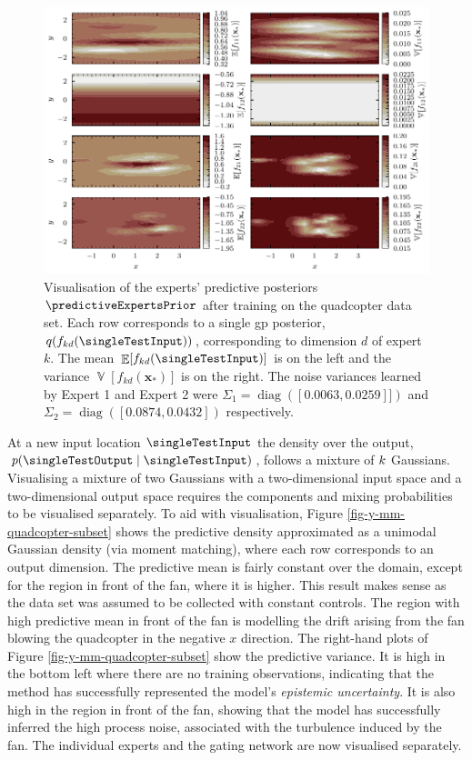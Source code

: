 \documentclass{mimosis-class/mimosis}
\numberwithin{equation}{chapter}
\newcommand{\diag}{\mathop{\mathrm{diag}}}
\DeclareMathOperator{\E}{\mathbb{E}}
\DeclareMathOperator{\V}{\mathbb{V}}
\newcommand{\modeInd}{\ensuremath{k}}
\newcommand{\ModeInd}{\ensuremath{\MakeUppercase{\modeInd}}}
\newcommand{\x}{\ensuremath{\mathbf{x}}}
\begin{document}
{\begin{figure}[t!]
\centering
\includegraphics[width=1\textwidth]{./images/model/quadcopter/subset-10/experts_f.pdf}
\caption[\acrshort{mosvgpe}'s experts' posteriors with \(\ModeInd=2\) after training on the real-world quadcopter data set with \(\furtherBound\)]{\label{fig-experts-f-quadcopter-subset}Visualisation of the experts' predictive posteriors \(\predictiveExpertsPrior\) after training on the quadcopter data set. Each row corresponds to a single \acrshort{gp} posterior, \(q(f_{kd}(\singleTestInput))\), corresponding to dimension \(d\) of expert \(\modeInd\). The mean \(\E[f_{kd}(\singleTestInput)]\) is on the left and the variance \(\V[f_{kd}(\x_*)]\) is on the right. The noise variances learned by Expert 1 and Expert 2 were \(\Sigma_1 = \diag\left([0.0063, 0.0259]]\right)\) and \(\Sigma_2 = \diag\left([0.0874, 0.0432]\right)\) respectively.}
\end{figure}


At a new input location \(\singleTestInput\) the density over the output,
\(p(\singleTestOutput \mid \singleTestInput)\),
follows a mixture of \(\ModeInd\) Gaussians.
Visualising a mixture of two Gaussians with a two-dimensional input space and a two-dimensional output space
requires the components and mixing probabilities to be visualised separately.
To aid with visualisation, Figure \ref{fig-y-mm-quadcopter-subset} shows the predictive density
approximated as a unimodal Gaussian density (via moment matching), where each row corresponds to an
output dimension.
The predictive mean is fairly constant over the domain, except for the region in front of the fan, where it is
higher.
This result makes sense as the data set was assumed to be collected with constant controls.
The region with high predictive mean in front of the fan is modelling the drift arising from the fan blowing the quadcopter in the negative \(x\) direction.
The right-hand plots of Figure \ref{fig-y-mm-quadcopter-subset}
show the predictive variance. It is high in the bottom left where there are no training observations,
indicating that the method has successfully represented the model's \emph{epistemic uncertainty}.
It is also high in the region in front of the fan, showing that the model has successfully inferred
the high process noise, associated with the turbulence induced by the fan.
The individual experts and the gating network are now visualised separately.

}
\end{document}
